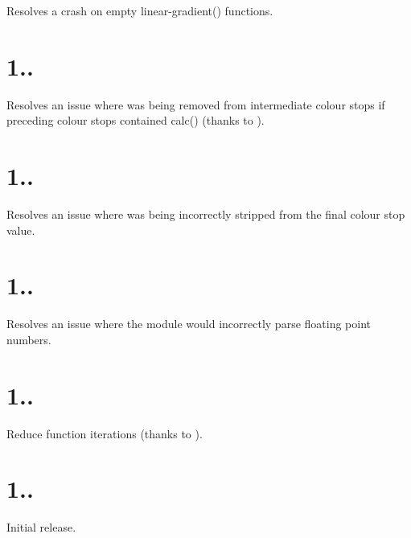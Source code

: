 
\begin{DoxyItemize}
\item Resolves a crash on empty {\ttfamily linear-\/gradient()} functions.
\end{DoxyItemize}

\section*{1..}


\begin{DoxyItemize}
\item Resolves an issue where {} was being removed from intermediate colour stops if preceding colour stops contained {\ttfamily calc()} (thanks to ).
\end{DoxyItemize}

\section*{1..}


\begin{DoxyItemize}
\item Resolves an issue where {} was being incorrectly stripped from the final colour stop value.
\end{DoxyItemize}

\section*{1..}


\begin{DoxyItemize}
\item Resolves an issue where the module would incorrectly parse floating point numbers.
\end{DoxyItemize}

\section*{1..}


\begin{DoxyItemize}
\item Reduce function iterations (thanks to ).
\end{DoxyItemize}

\section*{1..}


\begin{DoxyItemize}
\item Initial release. 
\end{DoxyItemize}